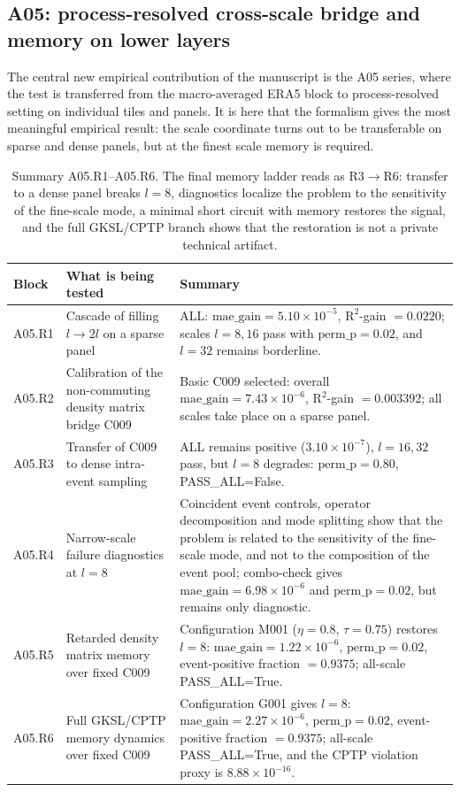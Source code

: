 \documentclass[11pt,a4paper]{article}
\theoremstyle{definition}
\theoremstyle{plain}
\theoremstyle{remark}
\begin{document}
\subsection{A05: process-resolved cross-scale bridge and memory on lower layers}

The central new empirical contribution of the manuscript is the A05 series, where the test is transferred
from the macro-averaged ERA5 block to process-resolved setting on individual tiles and panels.
It is here that the formalism gives the most meaningful empirical result:
the scale coordinate turns out to be transferable on sparse and dense panels, but at the finest scale memory is required.

\begin{table}[t]
\centering
\caption{Summary A05.R1--A05.R6. The final memory ladder reads as R3$\to$R6: transfer to a dense panel breaks $l=8$, diagnostics localize the problem to the sensitivity of the fine-scale mode, a minimal short circuit with memory restores the signal, and the full GKSL/CPTP branch shows that the restoration is not a private technical artifact.}
\label{tab:A05_summary}
\small
\begin{tabular}{@{}p{1.4cm}p{4.9cm}p{6.0cm}@{}}
\toprule
Block & What is being tested & Summary \\
\midrule
A05.R1 & Cascade of filling $l\to 2l$ on a sparse panel & ALL: $\mathrm{mae\_gain}=5.10\times10^{-5}$, $\mathrm{R}^2$-gain $=0.0220$; scales $l=8,16$ pass with $\mathrm{perm\_p}=0.02$, and $l=32$ remains borderline. \\
A05.R2 & Calibration of the non-commuting density matrix bridge C009 & Basic C009 selected: overall $\mathrm{mae\_gain}=7.43\times10^{-6}$, $\mathrm{R}^2$-gain $=0.003392$; all scales take place on a sparse panel. \\
A05.R3 & Transfer of C009 to dense intra-event sampling & ALL remains positive ($3.10\times10^{-7}$), $l=16,32$ pass, but $l=8$ degrades: $\mathrm{perm\_p}=0.80$, PASS\_ALL=False. \\
A05.R4 & Narrow-scale failure diagnostics at $l=8$ & Coincident event controls, operator decomposition and mode splitting show that the problem is related to the sensitivity of the fine-scale mode, and not to the composition of the event pool; combo-check gives $\mathrm{mae\_gain}=6.98\times10^{-6}$ and $\mathrm{perm\_p}=0.02$, but remains only diagnostic. \\
A05.R5 & Retarded density matrix memory over fixed C009 & Configuration M001 ($\eta=0.8$, $\tau=0.75$) restores $l=8$: $\mathrm{mae\_gain}=1.22\times10^{-6}$, $\mathrm{perm\_p}=0.02$, event-positive fraction $=0.9375$; all-scale PASS\_ALL=True. \\
A05.R6 & Full GKSL/CPTP memory dynamics over fixed C009 & Configuration G001 gives $l=8$: $\mathrm{mae\_gain}=2.27\times10^{-6}$, $\mathrm{perm\_p}=0.02$, event-positive fraction $=0.9375$; all-scale PASS\_ALL=True, and the CPTP violation proxy is $8.88\times10^{-16}$. \\
\bottomrule
\end{tabular}
\end{table}
\end{document}
